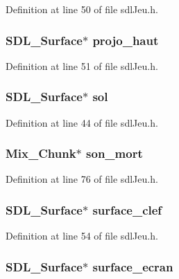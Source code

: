 Definition at line 50 of file sdl\-Jeu.\-h.

\hypertarget{structsdl_jeu_a18c766351a8d4a2399cde76a7d894559}{
\subsubsection[{projo\-\_\-haut}]{\setlength{\rightskip}{0pt plus 5cm}S\-D\-L\-\_\-\-Surface$\ast$ projo\-\_\-haut}}\label{structsdl_jeu_a18c766351a8d4a2399cde76a7d894559}


Definition at line 51 of file sdl\-Jeu.\-h.

\hypertarget{structsdl_jeu_a9fe0fcc6750250a9b4ed6c34c6ac18d2}{
\subsubsection[{sol}]{\setlength{\rightskip}{0pt plus 5cm}S\-D\-L\-\_\-\-Surface$\ast$ sol}}\label{structsdl_jeu_a9fe0fcc6750250a9b4ed6c34c6ac18d2}


Definition at line 44 of file sdl\-Jeu.\-h.

\hypertarget{structsdl_jeu_a4dc97c9681105e31fd50f5cc1d4db7fa}{
\subsubsection[{son\-\_\-mort}]{\setlength{\rightskip}{0pt plus 5cm}Mix\-\_\-\-Chunk$\ast$ son\-\_\-mort}}\label{structsdl_jeu_a4dc97c9681105e31fd50f5cc1d4db7fa}


Definition at line 76 of file sdl\-Jeu.\-h.

\hypertarget{structsdl_jeu_a5d1c1a5b6d8f7dd5b4f69871198f36b9}{
\subsubsection[{surface\-\_\-clef}]{\setlength{\rightskip}{0pt plus 5cm}S\-D\-L\-\_\-\-Surface$\ast$ surface\-\_\-clef}}\label{structsdl_jeu_a5d1c1a5b6d8f7dd5b4f69871198f36b9}


Definition at line 54 of file sdl\-Jeu.\-h.

\hypertarget{structsdl_jeu_a3970583cd7133d59e68d97fc4023ab99}{
\subsubsection[{surface\-\_\-ecran}]{\setlength{\rightskip}{0pt plus 5cm}S\-D\-L\-\_\-\-Surface$\ast$ surface\-\_\-ecran}}\label{structsdl_jeu_a3970583cd7133d59e68d97fc4023ab99}


